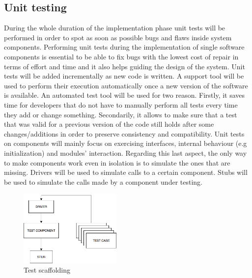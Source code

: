 \documentclass[titlepage]{article}
\begin{document}
\subsection{Unit testing}
During the whole duration of the implementation phase unit tests will be performed in order to spot as soon as possible bugs and flaws inside system components. Performing unit tests during the implementation of single software components is essential to be able to fix bugs with the lowest cost of repair in terms of effort and time and it also helps guiding the design of the system.
Unit tests will be added incrementally as new code is written. A support tool will be used to perform their execution automatically once a new version of the software is available. An automated test tool will be used for two reason. Firstly, it saves time for developers that do not have to manually perform all tests every time they add or change something. Secondarily, it allows to make sure that a test that was valid for a previous version of the code still holds after some changes/additions in order to preserve consistency and compatibility.
Unit tests on components will mainly focus on exercising interfaces, internal behaviour (e.g initialization) and modules’ interaction. Regarding this last aspect, the only way to make components work even in isolation is to simulate the ones that are missing. Drivers will be used to simulate calls to a certain component. Stubs will be used to simulate the calls made by a component under testing.
\begin{figure}[H]
	\center
  	\includegraphics[width=5cm]{UnitTest.png}
  	\caption{Test scaffolding}
 	\label{fig:testScaffoling}
\end{figure}
\end{document}
